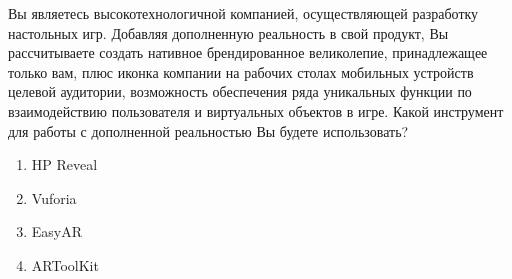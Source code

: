 
Вы являетесь высокотехнологичной компанией, осуществляющей разработку настольных игр. Добавляя дополненную реальность в свой продукт, Вы рассчитываете создать нативное брендированное великолепие, принадлежащее только вам, плюс иконка компании на рабочих столах мобильных устройств целевой аудитории, возможность обеспечения ряда уникальных функции по взаимодействию пользователя и виртуальных объектов в игре. Какой инструмент для работы с дополненной реальностью Вы будете использовать?

\begin{enumerate}
    \item HP Reveal
    \item Vuforia
    \item EasyAR
    \item ARToolKit
\end{enumerate}